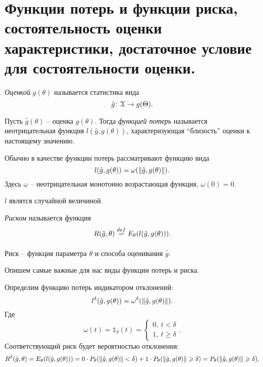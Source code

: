 \section{Функции потерь и функции риска, состоятельность оценки характеристики, 
достаточное условие для состоятельности оценки.}

\begin{definition}
	\textit{Оценкой} $g(\theta)$ называется статистика вида
	\[
		\hat{g} \colon \mathcal{X} \to g(\Theta)
	.\]
\end{definition}

\begin{definition}
	Пусть $\hat{g}(\theta)$ -- оценка $g(\theta)$. Тогда \textit{функцией
	потерь} называется неотрицательная функция $l(\hat{g}, g(\theta))$, 
	характеризующая ``близость'' оценки к настоящему значению.
\end{definition}

\begin{remark}
	Обычно в качестве функции потерь рассматривают функцию вида
	\[
		l(\hat{g}, g(\theta)) = \omega(\lVert\hat{g}, g(\theta)\rVert)
	.\]
	Здесь $\omega$ -- неотрицательная монотонно возрастающая функция,
	$\omega(0) = 0$.
\end{remark}

\begin{remark}
	$l$ являтся случайной величиной.
\end{remark}

\begin{definition}
	\textit{Риском} называется функция
	\[
		R(\hat{g}, \theta) \overset{def}{\underset{}{=}} E_{\theta}(l(\hat{g}, g(\theta))) 
	.\]
\end{definition}

\begin{remark}
	Риск -- функция параметра $\theta$ и способа оценивания $\hat{g}$.
\end{remark}

Опишем самые важные для нас виды функции потерь и риска.

\begin{definition}
	Определим функцию потерь индикатором отклонений:
	\[
		l^\delta(\hat{g}, g(\theta)) = \omega^\delta(\lVert\hat{g}, g(\theta)\rVert)
	.\] 
	Где
	\[
		\omega(t) = \mathbb{1}_\delta(t) = \begin{cases}
			0,~ t < \delta  \\
			1,~ t \geqslant \delta
		\end{cases}
	.\]
	Соответствующий риск будет вероятностью отклонения:
	\[
		R^\delta(\hat{g}, \theta) = E_{\theta}(l(\hat{g}, g(\theta))) =
	0 \cdot P_\theta(\lVert\hat{g}, g(\theta)\rVert < \delta) +
	1 \cdot P_\theta(\lVert\hat{g}, g(\theta)\rVert \geqslant \delta) =
	P_\theta(\lVert\hat{g}, g(\theta)\rVert \geqslant \delta)
	.\]
\end{definition}

